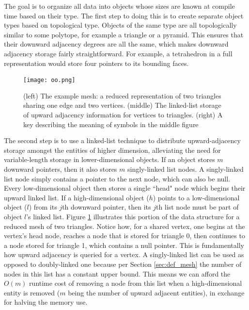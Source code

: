 The goal is to organize all data into objects whose
sizes are known at compile time based on their type.
The first step to doing this is to create separate object types
based on topological type.
Objects of the same type are all topologically similar to some polytope,
for example a triangle or a pyramid.
This ensures that their downward adjacency degrees are all the same,
which makes downward adjacency storage fairly straightforward.
For example, a tetrahedron in a full representation would store
four pointers to its bounding faces.

\begin{figure}
\begin{center}
\texttt{[image: oo.png]}
\caption{(left) The example mesh: a reduced representation of two
triangles sharing one edge and two vertices.
(middle) The linked-list storage of upward adjacency information
for vertices to triangles.
(right) A key describing the meaning of symbols in the middle figure}
\label{fig:oo}
\end{center}
\end{figure}

The second step is to use a linked-list technique \cite{karamete2016novel}
to distribute upward-adjacency storage amongst the entities
of higher dimension, alleviating the need for variable-length
storage in lower-dimensional objects.
If an object stores $m$ downward pointers, then it also stores
$m$ singly-linked list nodes.
A singly-linked list node simply contains a pointer to the next
node, which can also be null.
Every low-dimensional object then stores a single ``head" node
which begins their upward linked list.
If a high-dimensional object ($h$) points to a low-dimensional object ($l$)
from its $j$th downward pointer, then its $j$th list node must be
part of object $l$'s linked list.
Figure \ref{fig:oo} illustrates this portion of the data structure
for a reduced mesh of two triangles.
Notice how, for a shared vertex, one begins at the vertex's head node,
reaches a node that is stored for triangle 0, then continues
to a node stored for triangle 1, which contains a null pointer.
This is fundamentally how upward adjacency is queried for a vertex.
A singly-linked list can be used as opposed to doubly-linked one
because per Section \ref{sec:def_mesh}
the number of nodes in this list has a constant upper bound.
This means we can afford the $O(m)$ runtime cost of removing a node from this
list when a high-dimensional entity is removed
($m$ being the number of upward adjacent entities),
in exchange for halving the memory use.

